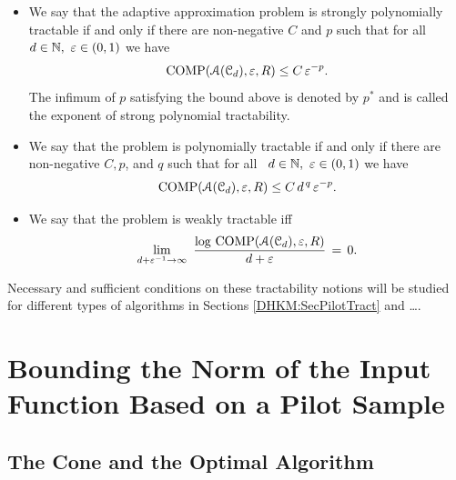 \documentclass[USenglish]{article}
\theoremstyle{dgthm}
\theoremstyle{dgthm}
\theoremstyle{dgthm}
\theoremstyle{dgthm}
\theoremstyle{dgdef}
\DeclareMathOperator{\COMP}{COMP}
\begin{document}
\begin{itemize}   
\item We say that the adaptive approximation problem is strongly polynomially tractable
if and only if there are non-negative $C$ and $p$ such that   
for all \ $d\in{\mathbb{N}},\ \varepsilon\in (0,1)$ we have   
$$   
\COMP(\calA(\calC_d), \varepsilon,R)\le C\,\varepsilon^{-p}.
$$   
The infimum of $p$ satisfying the bound above is denoted by $p^*$   
and is called the exponent of strong polynomial tractability.    
\newline \qquad   

\item    
We say that the problem is polynomially tractable
if and only if there are non-negative $C,p$, and $q$ such that   
for all \ $d\in{\mathbb{N}},\ \varepsilon\in (0,1)$ we have   
$$   
\COMP(\calA(\calC_d), \varepsilon,R)\le C\,d^{\,q}\,   
\varepsilon^{-p}.   
$$   
\vskip 0.5pc     
 

   
\item   
We say that the problem is weakly tractable iff    
$$   
\lim_{d+\varepsilon^{-1}\to\infty}\   
\frac{\log\, \COMP(\calA(\calC_d), \varepsilon,R)}   
{d+\varepsilon}\,=\,0.   
$$    
\end{itemize}   

Necessary and sufficient conditions on these tractability notions will be studied 
for different types of algorithms in Sections \ref{DHKM:SecPilotTract} and \ldots . 


\section{Bounding the Norm of the Input Function Based on a Pilot Sample} 

\subsection{The Cone and the Optimal Algorithm}
\end{document}
